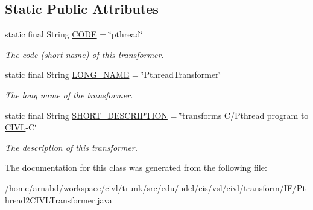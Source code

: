 \subsection*{Static Public Attributes}
\begin{DoxyCompactItemize}
\item 
\hypertarget{classedu_1_1udel_1_1cis_1_1vsl_1_1civl_1_1transform_1_1IF_1_1Pthread2CIVLTransformer_aaa5059a921f0f8093d411afe3e9b269b}{}static final String \hyperlink{classedu_1_1udel_1_1cis_1_1vsl_1_1civl_1_1transform_1_1IF_1_1Pthread2CIVLTransformer_aaa5059a921f0f8093d411afe3e9b269b}{C\+O\+D\+E} = \char`\"{}pthread\char`\"{}\label{classedu_1_1udel_1_1cis_1_1vsl_1_1civl_1_1transform_1_1IF_1_1Pthread2CIVLTransformer_aaa5059a921f0f8093d411afe3e9b269b}

\begin{DoxyCompactList}\small\item\em The code (short name) of this transformer. \end{DoxyCompactList}\item 
\hypertarget{classedu_1_1udel_1_1cis_1_1vsl_1_1civl_1_1transform_1_1IF_1_1Pthread2CIVLTransformer_ab950f5d38bdcd3146f7ecf8ab8e48a65}{}static final String \hyperlink{classedu_1_1udel_1_1cis_1_1vsl_1_1civl_1_1transform_1_1IF_1_1Pthread2CIVLTransformer_ab950f5d38bdcd3146f7ecf8ab8e48a65}{L\+O\+N\+G\+\_\+\+N\+A\+M\+E} = \char`\"{}Pthread\+Transformer\char`\"{}\label{classedu_1_1udel_1_1cis_1_1vsl_1_1civl_1_1transform_1_1IF_1_1Pthread2CIVLTransformer_ab950f5d38bdcd3146f7ecf8ab8e48a65}

\begin{DoxyCompactList}\small\item\em The long name of the transformer. \end{DoxyCompactList}\item 
\hypertarget{classedu_1_1udel_1_1cis_1_1vsl_1_1civl_1_1transform_1_1IF_1_1Pthread2CIVLTransformer_a1a3cdfb71746c207497b959e8226e6f7}{}static final String \hyperlink{classedu_1_1udel_1_1cis_1_1vsl_1_1civl_1_1transform_1_1IF_1_1Pthread2CIVLTransformer_a1a3cdfb71746c207497b959e8226e6f7}{S\+H\+O\+R\+T\+\_\+\+D\+E\+S\+C\+R\+I\+P\+T\+I\+O\+N} = \char`\"{}transforms C/Pthread program to \hyperlink{classedu_1_1udel_1_1cis_1_1vsl_1_1civl_1_1CIVL}{C\+I\+V\+L}-\/C\char`\"{}\label{classedu_1_1udel_1_1cis_1_1vsl_1_1civl_1_1transform_1_1IF_1_1Pthread2CIVLTransformer_a1a3cdfb71746c207497b959e8226e6f7}

\begin{DoxyCompactList}\small\item\em The description of this transformer. \end{DoxyCompactList}\end{DoxyCompactItemize}


The documentation for this class was generated from the following file\+:\begin{DoxyCompactItemize}
\item 
/home/arnabd/workspace/civl/trunk/src/edu/udel/cis/vsl/civl/transform/\+I\+F/Pthread2\+C\+I\+V\+L\+Transformer.\+java\end{DoxyCompactItemize}
